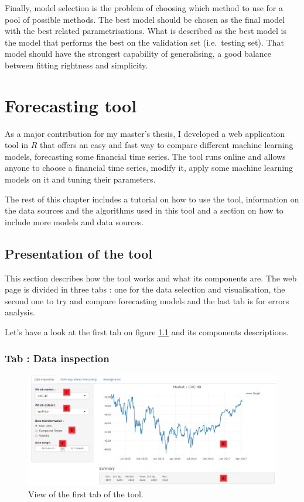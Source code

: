 \documentclass[11pt,a4paper,oneside]{book}
\begin{document}
Finally, model selection is the problem of choosing which method to use for a pool of possible methods. The best model should be chosen as the final model with the best related parametrisations. What is described as the best model is the model that performs the best on the validation set (i.e.\ testing set). That model should have the strongest capability of generalising, a good balance between fitting rightness and simplicity. \cite{BenTaieb}





\chapter{Forecasting tool}

As a major contribution for my master's thesis, I developed a web application tool in \textbf{$R$} that offers an easy and fast way to compare different machine learning models, forecasting some financial time series. The tool runs online and allows anyone to choose a financial time series, modify it, apply some machine learning models on it and tuning their parameters. 

The rest of this chapter includes a tutorial on how to use the tool, information on the data sources and the algorithms used in this tool and a section on how to include more models and data sources. 


\section{Presentation of the tool}

This section describes how the tool works and what its components are. The web page is divided in three tabs : one for the data selection and visualisation, the second one to try and compare forecasting models and the last tab is for errors analysis. 

Let's have a look at the first tab on figure \ref{fig:tool1} and its components descriptions.

\subsection{Tab : Data inspection}


\begin{figure}[!h]
  \centering
    \includegraphics[scale=0.44]{img/tab1.png}
  \caption{View of the first tab of the tool.}
  \label{fig:tool1}
\end{figure}
\end{document}
